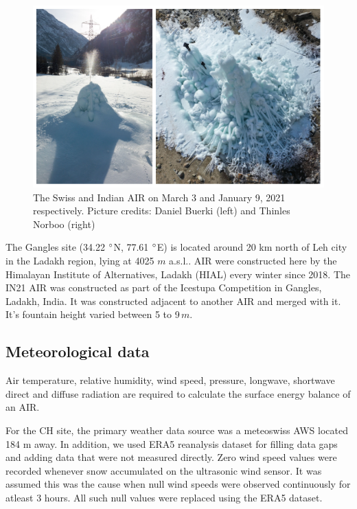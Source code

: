\documentclass[utf8]{frontiersSCNS} %
\begin{document}
\begin{figure}
	\begin{center}
		\includegraphics[width=12 cm]{Figures/2AIR.jpg}
	\end{center}
	\caption{The Swiss and Indian AIR on March 3 and January 9, 2021 respectively. Picture credits: Daniel Buerki (left)
		and Thinles Norboo (right)}
	\label{fig:CHsite}
\end{figure}

The Gangles site (34.22 $\degree$N, 77.61 $\degree$E) is located around 20 km north of Leh city in the Ladakh region,
lying at 4025 $m$ a.s.l.. AIR were constructed here by the Himalayan Institute of Alternatives, Ladakh (HIAL) every
winter since 2018. The IN21 AIR was constructed as part of the Icestupa Competition in Gangles, Ladakh, India. It was
constructed adjacent to another AIR and merged with it. It's fountain height varied between 5 to 9\,$m$.

\subsection{Meteorological data}
Air temperature, relative humidity, wind speed, pressure, longwave, shortwave direct and diffuse radiation are required
to calculate the surface energy balance of an AIR.

For the CH site, the primary weather data source was a meteoswiss AWS located 184 m away. In addition, we used ERA5
reanalysis dataset \citep{era5} for filling data gaps and adding data that were not measured directly. Zero wind speed values were recorded whenever snow accumulated on the ultrasonic wind sensor. It was
assumed this was the cause when null wind speeds were observed continuously for atleast 3 hours. All such null values
were replaced using the ERA5 dataset.
\end{document}
